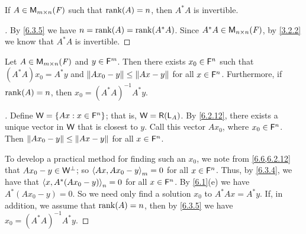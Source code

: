 \begin{cor}\label{6.3.6}
	If \(A \in \mathsf{M}_{{m} \times n}({\mathit{F}})\) such that \(\rk{A} = n\), then \(A^* A\) is invertible.
\end{cor}

\begin{proof}[]
	By \cref{6.3.5} we have \(n = \rk{A} = \rk{A^* A}\).
	Since \(A^* A \in \mathsf{M}_{{n} \times n}({\mathit{F}})\), by \cref{3.2.2} we know that \(A^* A\) is invertible.
\end{proof}

\begin{thm}\label{6.12}
	Let \(A \in \mathsf{M}_{{m} \times n}({\mathit{F}})\) and \(y \in \mathsf{F}^m\).
	Then there exists \(x_0 \in \mathsf{F}^n\) such that \((A^* A) x_0 = A^* y\) and \(\left\lVert A x_0 - y\right\rVert \leq \left\lVert Ax - y\right\rVert\) for all \(x \in \mathsf{F}^n\).
	Furthermore, if \(\rk{A} = n\), then \(x_0 = (A^* A)^{-1} A^* y\).
\end{thm}

\begin{proof}[]
	Define \(\mathsf{W} = \left\lbrace Ax : x \in \mathsf{F}^n\right\rbrace\);
	that is, \(\W = \rg{\L_A}\).
	By \cref{6.2.12}, there exists a unique vector in \(\mathsf{W}\) that is closest to \(y\).
	Call this vector \(A x_0\), where \(x_0 \in \mathsf{F}^n\).
	Then \(\left\lVert A x_0 - y\right\rVert \leq \left\lVert Ax - y\right\rVert\) for all \(x \in \mathsf{F}^n\).

	To develop a practical method for finding such an \(x_0\), we note from \cref{6.6,6.2.12} that \(A x_0 - y \in \mathsf{W}^{\perp}\);
	so \(\left\langle Ax, A x_0 - y\right\rangle_m = 0\) for all \(x \in \mathsf{F}^n\).
	Thus, by \cref{6.3.4}, we have that \(\left\langle x, A^* (A x_0 - y)\right\rangle_n = 0\) for all \(x \in \mathsf{F}^n\).
	By \cref{6.1}(e) we have \(A^* (A x_0 - y) = 0\).
	So we need only find a solution \(x_0\) to \(A^* Ax = A^* y\).
	If, in addition, we assume that \(\rk{A} = n\), then by \cref{6.3.5} we have \(x_0 = (A^* A)^{-1} A^* y\).
\end{proof}

